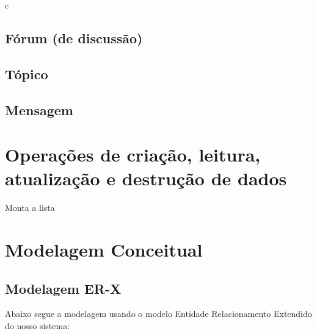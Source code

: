c\documentclass{article}
\begin{document}
	\subsection{Fórum (de discussão)}

	\subsection{Tópico}

	\subsection{Mensagem}


\section{Operações de criação, leitura, atualização e destrução de dados}

	Monta a lista


\section{Modelagem Conceitual}

	\subsection{Modelagem ER-X}
	Abaixo segue a modelagem usando o modelo Entidade Relacionamento Extendido do nosso sistema:\\
\end{document}
